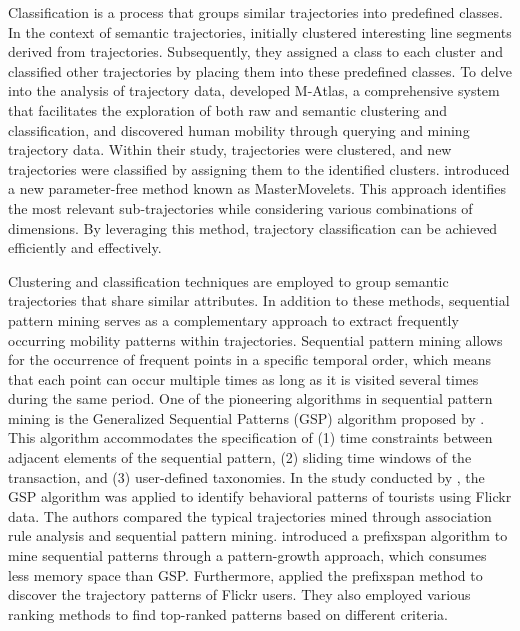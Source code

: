 \documentclass{article}
\theoremstyle{remark}
\begin{document}
Classification is a process that groups similar trajectories into predefined classes. In the context of semantic trajectories, \cite{lee_trajectory_2007} initially clustered interesting line segments derived from trajectories. Subsequently, they assigned a class to each cluster and classified other trajectories by placing them into these predefined classes. To delve into the analysis of trajectory data, \cite{giannotti_unveiling_2011} developed M-Atlas, a comprehensive system that facilitates the exploration of both raw and semantic clustering and classification, and discovered human mobility through querying and mining trajectory data. Within their study, trajectories were clustered, and new trajectories were classified by assigning them to the identified clusters. \cite{ferrero_mastermovelets_2020} introduced a new parameter-free method known as MasterMovelets. This approach identifies the most relevant sub-trajectories while considering various combinations of dimensions. By leveraging this method, trajectory classification can be achieved efficiently and effectively. 

Clustering and classification techniques are employed to group semantic trajectories that share similar attributes. In addition to these methods, sequential pattern mining serves as a complementary approach to extract frequently occurring mobility patterns within trajectories. Sequential pattern mining allows for the occurrence of frequent points in a specific temporal order, which means that each point can occur multiple times as long as it is visited several times during the same period. One of the pioneering algorithms in sequential pattern mining is the Generalized Sequential Patterns (GSP) algorithm proposed by \cite{srikant_mining_1996}. This algorithm accommodates the specification of (1) time constraints between adjacent elements of the sequential pattern, (2) sliding time windows of the transaction, and (3) user-defined taxonomies. In the study conducted by \cite{hopken_flickr_2020}, the GSP algorithm was applied to identify behavioral patterns of tourists using Flickr data. The authors compared the typical trajectories mined through association rule analysis and sequential pattern mining. \cite{pei_mining_2004} introduced a \acrfull{prefixspan} algorithm to mine sequential patterns through a pattern-growth approach, which consumes less memory space than GSP. Furthermore, \cite{yin_diversified_2011} applied the \acrshort{prefixspan} method to discover the trajectory patterns of Flickr users. They also employed various ranking methods to find top-ranked patterns based on different criteria.
\end{document}
